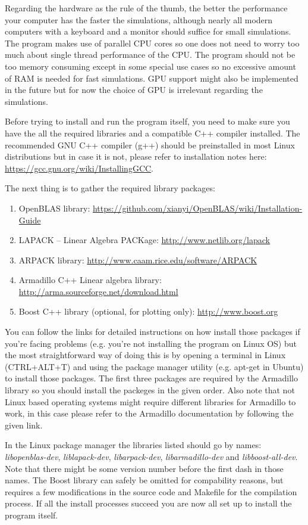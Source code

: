 \documentclass[english,12pt,a4paper,pdftex,sci,utf8]{aaltothesis}
\begin{document}
Regarding the hardware as the rule of the thumb, the better the performance your computer has the faster the simulations, although nearly all modern computers with a keyboard and a monitor should suffice for small simulations. The program makes use of parallel CPU cores so one does not need to worry too much about single thread performance of the CPU. The program should not be too memory consuming except in some special use cases so no excessive amount of RAM is needed for fast simulations. GPU support might also be implemented in the future but for now the choice of GPU is irrelevant regarding the simulations.
\par Before trying to install and run the program itself, you need to make sure you have the all the required libraries and a compatible C++ compiler installed. The recommended GNU C++ compiler (g++) should be preinstalled in most Linux distributions but in case it is not, please refer to installation notes here: \url{https://gcc.gnu.org/wiki/InstallingGCC}. 
\par The next thing is to gather the required library packages:
\begin{enumerate}
\item OpenBLAS library: \url{https://github.com/xianyi/OpenBLAS/wiki/Installation-Guide}
\item LAPACK -- Linear Algebra PACKage: \url{http://www.netlib.org/lapack}
\item ARPACK library: \url{http://www.caam.rice.edu/software/ARPACK}
\item Armadillo C++ Linear algebra library: \url{http://arma.sourceforge.net/download.html} 
\item Boost C++ library (optional, for plotting only): \url{http://www.boost.org}
\end{enumerate}
You can follow the links for detailed instructions on how install those packages if you're facing problems (e.g. you're not installing the program on Linux OS) but the most straightforward way of doing this is by opening a terminal in Linux (CTRL+ALT+T) and using the package manager utility (e.g. apt-get in Ubuntu) to install those packages. The first three packages are required by the Armadillo library so you should install the packeges in the given order. Also note that not Linux based operating systems might require different libraries for Armadillo to work, in this case please refer to the Armadillo documentation by following the given link. 
\par In the Linux package manager the libraries listed should go by names: \textit{libopenblas-dev}, \textit{liblapack-dev}, \textit{libarpack-dev}, \textit{libarmadillo-dev} and \textit{libboost-all-dev}. Note that there might be some version number before the first dash in those names. The Boost library can safely be omitted for compability reasons, but requires a few modifications in the source code and Makefile for the compilation process. If all the install processes succeed you are now all set up to install the program itself.
\end{document}
